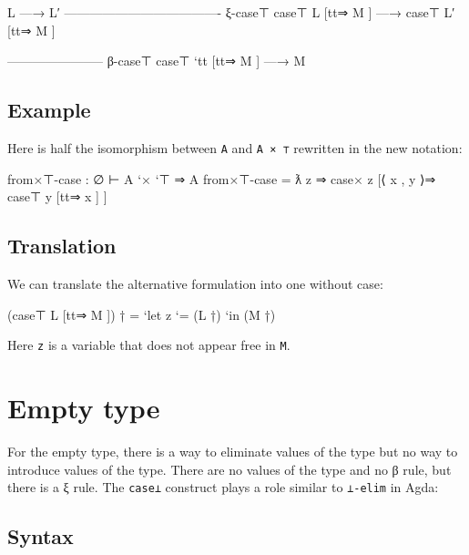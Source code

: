 \begin{myDisplay}
L —→ L′
------------------------------------- ξ-case⊤
case⊤ L [tt⇒ M ] —→ case⊤ L′ [tt⇒ M ]

----------------------- β-case⊤
case⊤ `tt [tt⇒ M ] —→ M
\end{myDisplay}

\hypertarget{example-6}{%
\subsection{Example}\label{example-6}}

Here is half the isomorphism between \texttt{A} and
\texttt{A\ \textasciigrave{}×\ \textasciigrave{}⊤} rewritten in the new
notation:

\begin{myDisplay}
from×⊤-case : ∅ ⊢ A `× `⊤ ⇒ A
from×⊤-case = ƛ z ⇒ case× z
                      [⟨ x , y ⟩⇒ case⊤ y
                                    [tt⇒ x ] ]
\end{myDisplay}

\hypertarget{translation-2}{%
\subsection{Translation}\label{translation-2}}

We can translate the alternative formulation into one without case:

\begin{myDisplay}
(case⊤ L [tt⇒ M ]) †  =  `let z `= (L †) `in (M †)
\end{myDisplay}

Here \texttt{z} is a variable that does not appear free in \texttt{M}.

\hypertarget{empty-type}{%
\section{Empty type}\label{empty-type}}

For the empty type, there is a way to eliminate values of the type but
no way to introduce values of the type. There are no values of the type
and no β rule, but there is a ξ rule. The \texttt{case⊥} construct plays
a role similar to \texttt{⊥-elim} in Agda:

\hypertarget{syntax-7}{%
\subsection{Syntax}\label{syntax-7}}

